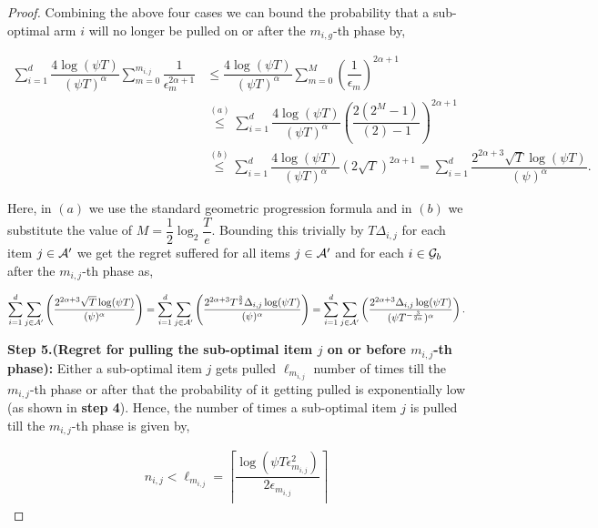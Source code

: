 \begin{proof}
Combining the above four cases we can bound the probability that a sub-optimal arm $i$ will no longer be pulled on or after the $m_{i,g}$-th phase by,

\begin{align*}
\sum_{i=1}^{d}\dfrac{4\log(\psi T )}{(\psi T)^{\alpha}}\sum_{m=0}^{m_{i,j}}\dfrac{1}{\epsilon_{m_{}}^{2\alpha +1}} &\leq \dfrac{4\log(\psi T )}{(\psi T)^{\alpha}}\sum_{m=0}^{M}\left(\dfrac{1}{\epsilon_{m}}\right)^{2\alpha +1}\\
& \overset{(a)}{\leq} \sum_{i=1}^{d}\dfrac{4\log(\psi T )}{(\psi T)^{\alpha}}\left(\dfrac{2(2^M - 1)}{(2) - 1}\right)^{2\alpha +1} \\
&\overset{(b)}{\leq} \sum_{i=1}^{d}\dfrac{4\log(\psi T )}{(\psi T)^{\alpha}}\left(2 \sqrt{T}\right)^{2\alpha +1} = \sum_{i=1}^{d}\dfrac{2^{2\alpha + 3}\sqrt{T}\log(\psi T )}{(\psi)^{\alpha}}.
\end{align*}

Here, in $(a)$ we use the standard geometric progression formula and  in $(b)$ we substitute the value of $M=\dfrac{1}{2}\log_{2}\dfrac{T}{e}$. Bounding this trivially by $T\Delta_{i,j}$ for each item $j\in\mathcal{A}'$ we get the regret suffered for all items $j\in\mathcal{A}'$ and for each $i\in\mathcal{G}_b$ after the $m_{i,j}$-th phase  as,

\begin{align*}
\sum_{i=1}^{d}\sum_{j\in\mathcal{A}'}\left( \dfrac{2^{2\alpha + 3}\sqrt{T}\log(\psi T )}{(\psi)^{\alpha}} \right) =  \sum_{i=1}^{d}\sum_{j\in\mathcal{A}'}\left( \dfrac{2^{2\alpha + 3}T^{\frac{3}{2}}\Delta_{i,j}\log(\psi T )}{(\psi)^{\alpha}} \right) =\sum_{i=1}^{d} \sum_{j\in\mathcal{A}'}\left( \dfrac{2^{2\alpha + 3}\Delta_{i,j}\log(\psi T )}{(\psi T^{-\frac{3}{2\alpha}})^{\alpha}} \right).
\end{align*}


\textbf{Step 5.(Regret for pulling the sub-optimal item $j$ on or before $m_{i,j}$-th phase):} Either a sub-optimal item $j$ gets pulled $\ell_{m_{i,j}}$ number of times till the $m_{i,j}$-th phase or after that the probability of it getting pulled is exponentially low (as shown in \textbf{step 4}). Hence, the number of times a sub-optimal item $j$ is pulled till the $m_{i,j}$-th phase is given by,

\begin{align*}
n_{i,j} < \ell_{m_{i,j}} = \left\lceil \dfrac{\log(\psi T\epsilon_{m_{i,j}}^2)}{2\epsilon_{m_{i,j}}} \right\rceil
\end{align*}


\end{proof}
